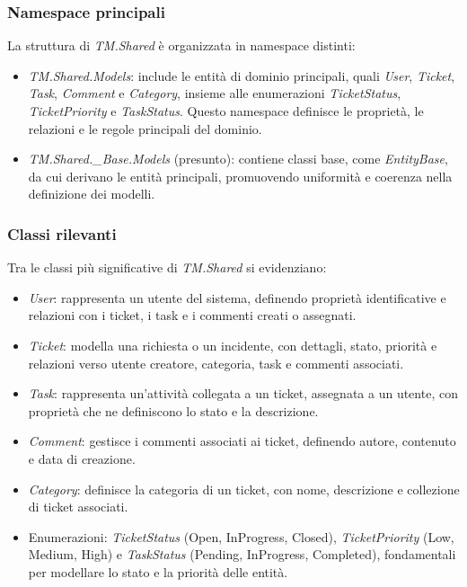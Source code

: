 \subsubsection{Namespace principali}

La struttura di \textit{TM.Shared} è organizzata in namespace distinti:
\begin{itemize}
\item \textit{TM.Shared.Models}: include le entità di dominio principali, quali \textit{User}, \textit{Ticket}, \textit{Task}, \textit{Comment} e \textit{Category}, insieme alle enumerazioni \textit{TicketStatus}, \textit{TicketPriority} e \textit{TaskStatus}. Questo namespace definisce le proprietà, le relazioni e le regole principali del dominio.

\item \textit{TM.Shared.\_Base.Models} (presunto): contiene classi base, come \textit{EntityBase}, da cui derivano le entità principali, promuovendo uniformità e coerenza nella definizione dei modelli.
\end{itemize}

\subsubsection{Classi rilevanti}

Tra le classi più significative di \textit{TM.Shared} si evidenziano:
\begin{itemize}
\item \textit{User}: rappresenta un utente del sistema, definendo proprietà identificative e relazioni con i ticket, i task e i commenti creati o assegnati.

\item \textit{Ticket}: modella una richiesta o un incidente, con dettagli, stato, priorità e relazioni verso utente creatore, categoria, task e commenti associati.

\item \textit{Task}: rappresenta un'attività collegata a un ticket, assegnata a un utente, con proprietà che ne definiscono lo stato e la descrizione.

\item \textit{Comment}: gestisce i commenti associati ai ticket, definendo autore, contenuto e data di creazione.

\item \textit{Category}: definisce la categoria di un ticket, con nome, descrizione e collezione di ticket associati.

\item Enumerazioni: \textit{TicketStatus} (Open, InProgress, Closed), \textit{TicketPriority} (Low, Medium, High) e \textit{TaskStatus} (Pending, InProgress, Completed), fondamentali per modellare lo stato e la priorità delle entità.
\end{itemize}

